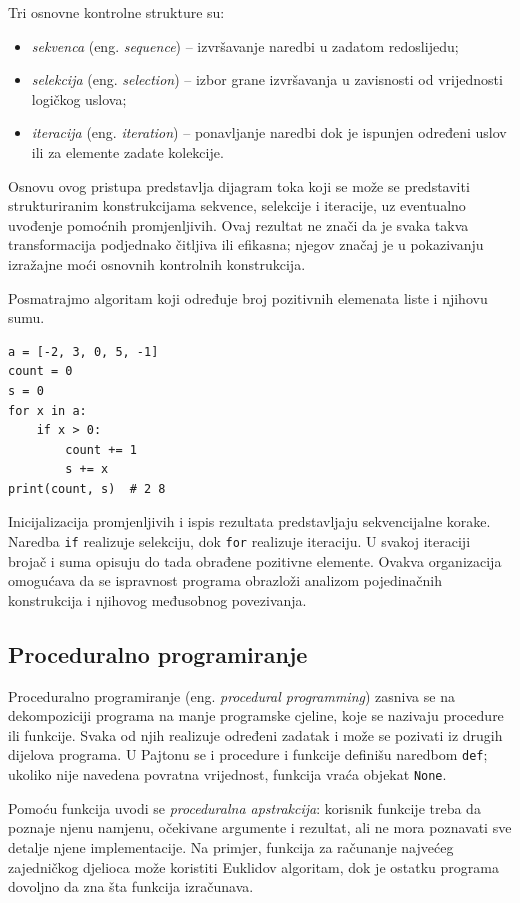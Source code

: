 Tri osnovne kontrolne strukture su:
\begin{itemize}
\item \textit{sekvenca} (eng. \textit{sequence}) -- izvršavanje naredbi u zadatom redoslijedu;
\item \textit{selekcija} (eng. \textit{selection}) -- izbor grane izvršavanja u zavisnosti od vrijednosti logičkog uslova;
\item \textit{iteracija} (eng. \textit{iteration}) -- ponavljanje naredbi dok je ispunjen određeni uslov ili za elemente zadate kolekcije.
\end{itemize}

Osnovu ovog pristupa predstavlja dijagram toka koji se može se predstaviti strukturiranim konstrukcijama sekvence, selekcije i iteracije, uz eventualno uvođenje pomoćnih promjenljivih. Ovaj rezultat ne znači da je svaka takva transformacija podjednako čitljiva ili efikasna; njegov značaj je u pokazivanju izražajne moći osnovnih kontrolnih konstrukcija.

Posmatrajmo algoritam koji određuje broj pozitivnih elemenata liste i njihovu sumu.
\begin{verbatim}
a = [-2, 3, 0, 5, -1]
count = 0
s = 0
for x in a:
    if x > 0:
        count += 1
        s += x
print(count, s)  # 2 8
\end{verbatim}

Inicijalizacija promjenljivih i ispis rezultata predstavljaju sekvencijalne korake. Naredba \texttt{if} realizuje selekciju, dok \texttt{for} realizuje iteraciju. U svakoj iteraciji brojač i suma opisuju do tada obrađene pozitivne elemente. Ovakva organizacija omogućava da se ispravnost programa obrazloži analizom pojedinačnih konstrukcija i njihovog međusobnog povezivanja.

\subsection{Proceduralno programiranje}

Proceduralno programiranje (eng. \textit{procedural programming}) zasniva se na dekompoziciji programa na manje programske cjeline, koje se nazivaju procedure ili funkcije. Svaka od njih realizuje određeni zadatak i može se pozivati iz drugih dijelova programa. U Pajtonu se i procedure i funkcije definišu naredbom \texttt{def}; ukoliko nije navedena povratna vrijednost, funkcija vraća objekat \texttt{None}.

Pomoću funkcija uvodi se \textit{proceduralna apstrakcija}: korisnik funkcije treba da poznaje njenu namjenu, očekivane argumente i rezultat, ali ne mora poznavati sve detalje njene implementacije. Na primjer, funkcija za računanje najvećeg zajedničkog djelioca može koristiti Euklidov algoritam, dok je ostatku programa dovoljno da zna šta funkcija izračunava.

